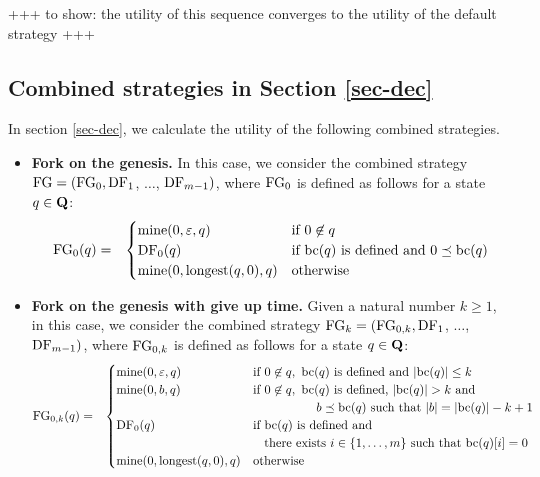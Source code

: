+++ to show: the utility of this sequence converges to the utility of the default strategy +++








\subsection{Combined strategies in Section \ref{sec-dec}}
In section \ref{sec-dec}, we calculate the utility of the following combined strategies.
\begin{itemize}
\item {\bf Fork on the genesis.} In this case, we consider the combined strategy $\text{\rm FG} = (\text{\rm FG}_0, \text{\rm DF}_1$, $\ldots$, $\text{\rm DF}_{m-1})$, where $\text{\rm FG}_0$ is defined as follows for a state $q \in \mathbf{Q}$:
\begin{eqnarray*}
\text{\rm FG}_0(q) & = &
\begin{cases}
\text{\rm mine}(0,\varepsilon,q) & \text{if } 0 \not\in q\\
\text{\rm DF}_0(q) & \text{if } \text{bc}(q) \text{ is defined and } 0 \preceq \text{bc}(q)\\
\text{\rm mine}(0,{\text{\rm longest}}(q,0),q) &  \text{otherwise}
\end{cases}
\end{eqnarray*}

\item {\bf Fork on the genesis with give up time.} Given a natural number $k \geq 1$, in this case, we consider the combined strategy $\text{\rm FG}_k = (\text{\rm FG}_{0,k}, \text{\rm DF}_1$, $\ldots$, $\text{\rm DF}_{m-1})$, where $\text{\rm FG}_{0,k}$ is defined as follows for a state $q \in \mathbf{Q}$:
\begin{eqnarray*}
\text{\rm FG}_{0,k}(q) & = &
\begin{cases}
\text{\rm mine}(0,\varepsilon,q) & \text{if } 0 \not\in q,\ \text{bc}(q) \text{ is defined and } |\text{bc}(q)| \leq k\\
\text{\rm mine}(0,b,q) & \text{if } 0 \not\in q,\ \text{bc}(q) \text{ is defined, } |\text{bc}(q)| > k \text{ and }\\
& \hspace{51pt} b \preceq \text{bc}(q) \text{ such that } |b| = |\text{bc}(q)|-k+1\\
\text{\rm DF}_0(q) & \text{if } \text{bc}(q) \text{ is defined and}\\
& \hspace{9pt} \text{there exists } i \in \{1, \ldots, m\} \text{ such that } \text{bc}(q)[i] = 0\\
\text{\rm mine}(0,{\text{\rm longest}}(q,0),q) &  \text{otherwise}
\end{cases}
\end{eqnarray*}

\end{itemize}

